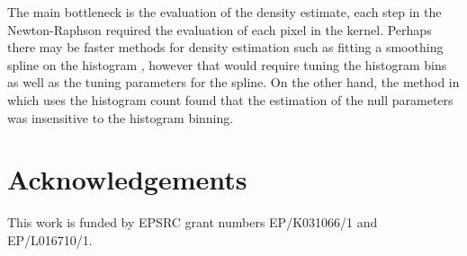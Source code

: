 \documentclass[twocolumn]{article}
\begin{document}
The main bottleneck is the evaluation of the density estimate, each step in the Newton-Raphson required the evaluation of each pixel in the kernel. Perhaps there may be faster methods for density estimation such as fitting a smoothing spline on the histogram \citep{efron2004large}, however that would require tuning the histogram bins as well as the tuning parameters for the spline. On the other hand, the method in \cite{schwartzman2008empirical} which uses the histogram count found that the estimation of the null parameters was insensitive to the histogram binning.

\section{Acknowledgements}
This work is funded by EPSRC grant numbers EP/K031066/1 and EP/L016710/1.



\end{document}
